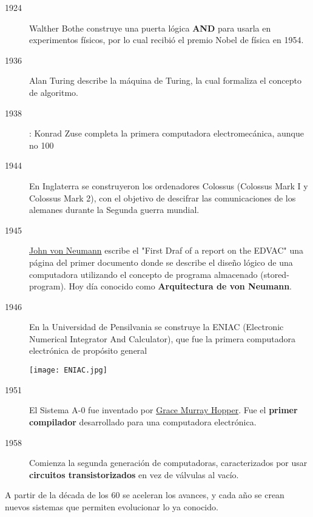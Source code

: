 \begin{description}
    \item[1924] Walther Bothe construye una puerta lógica \textbf{AND} para usarla en experimentos físicos, por lo cual recibió el premio Nobel de física en 1954.

    \item[1936] Alan Turing describe la máquina de Turing, la cual formaliza el concepto de algoritmo.

    \item[1938]: Konrad Zuse completa la primera computadora electromecánica, aunque no 100%

    \item[1944] En Inglaterra se construyeron los ordenadores Colossus (Colossus Mark I y Colossus Mark 2), con el objetivo de descifrar las comunicaciones de los alemanes durante la Segunda guerra mundial.

    \item[1945] \href{https://es.wikipedia.org/wiki/John_von_Neumann}{John von Neumann} escribe el "First Draf of a report on the EDVAC" una página del primer documento donde se describe el diseño lógico de una computadora utilizando el concepto de programa almacenado (stored-program). Hoy día conocido como \textbf{Arquitectura de von Neumann}.

    \item[1946] En la Universidad de Pensilvania se construye la ENIAC (Electronic Numerical Integrator And Calculator), que fue la primera computadora electrónica de propósito general

    \begin{center}
        \texttt{[image: ENIAC.jpg]}
    \end{center}

    \item[1951] El Sistema A-0 fue inventado por \href{https://es.wikipedia.org/wiki/Grace_Murray_Hopper}{Grace Murray Hopper}. Fue el \textbf{primer compilador} desarrollado para una computadora electrónica.

    \item[1958] Comienza la segunda generación de computadoras, caracterizados por usar \textbf{circuitos transistorizados} en vez de válvulas al vacío.

\end{description}

A partir de la década de los 60 se aceleran los avances, y cada año se crean nuevos sistemas que permiten evolucionar lo ya conocido.

